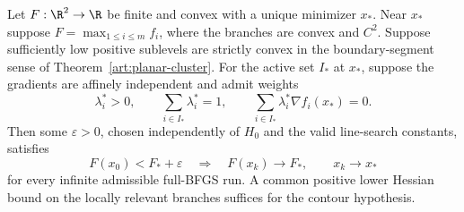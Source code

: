 \begin{corollary}\label{art:planar-max}
Let $F:\R^2\to\R$ be finite and convex with a unique minimizer $x_*$. Near
$x_*$ suppose $F=\max_{1\le i\le m}f_i$, where the branches are convex and
$C^2$. Suppose sufficiently low positive sublevels are strictly convex in
the boundary-segment sense of Theorem~\ref{art:planar-cluster}. For the
active set $I_*$ at $x_*$, suppose the gradients are affinely independent
and admit weights
\[
 \lambda_i^*>0,\qquad \sum_{i\in I_*}\lambda_i^*=1,
 \qquad \sum_{i\in I_*}\lambda_i^*\nabla f_i(x_*)=0.
\]
Then some $\varepsilon>0$, chosen independently of $H_0$ and the valid
line-search constants, satisfies
\[
 F(x_0)<F_*+\varepsilon
 \quad\Longrightarrow\quad F(x_k)\to F_*,\qquad x_k\to x_*
\]
for every infinite admissible full-BFGS run. A common positive lower Hessian
bound on the locally relevant branches suffices for the contour hypothesis.
\end{corollary}
